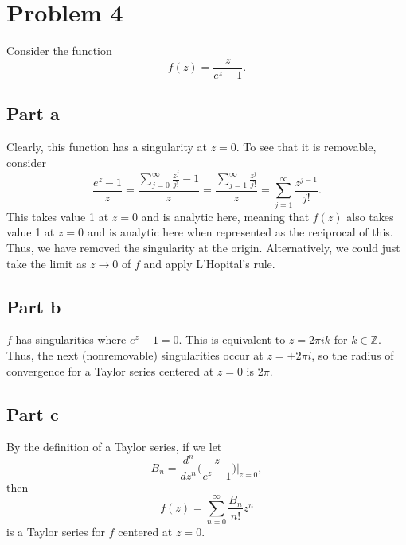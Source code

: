 \documentclass{article}
\begin{document}
\section{Problem 4}
Consider the function
	\[
	f(z)=\frac{z}{e^z-1}.
	\]
\subsection{Part a}
Clearly, this function has a singularity at $z=0$. To see that it is removable, consider
\[
\frac{e^z-1}{z}=\frac{\sum_{j=0}^\infty \frac{z^j}{j!}-1}{z}=\frac{\sum_{j=1}^\infty \frac{z^j}{j!}}{z}=\sum_{j=1}^\infty \frac{z^{j-1}}{j!}.
\]
This takes value 1 at $z=0$ and is analytic here, meaning that $f(z)$ also takes value 1 at $z=0$ and is analytic here when represented as the reciprocal of this. Thus, we have removed the singularity at the origin. Alternatively, we could just take the limit as $z\to0$ of $f$ and apply L'Hopital's rule.

\subsection{Part b}
$f$ has singularities where $e^z-1=0$. This is equivalent to $z=2\pi i k$ for $k\in\mathbb{Z}$. Thus, the next (nonremovable) singularities occur at $z=\pm2\pi i$, so the radius of convergence for a Taylor series centered at $z=0$ is $2\pi$. 
\subsection{Part c}
By the definition of a Taylor series, if we let 
\[
B_n=\frac{d^n}{dz^n}\biggr(\frac{z}{e^z-1}\biggr)\biggr|_{z=0},
\]
then 
\[
f(z)=\sum_{n=0}^\infty \frac{B_n}{n!}z^n
\]
is a Taylor series for $f$ centered at $z=0$. 
\end{document}
